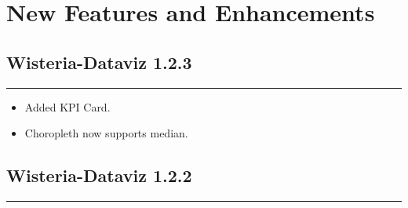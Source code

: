 \documentclass[
]{scrartcl}
\providecommand{\tightlist}{%
  \setlength{\itemsep}{0pt}\setlength{\parskip}{0pt}}
\begin{document}
\section{New Features and Enhancements}\label{sec-new-features}

\subsection*{Wisteria-Dataviz 1.2.3}\label{section}

\begin{center}\rule{0.5\linewidth}{0.5pt}\end{center}

\begin{itemize}
\tightlist
\item
  Added KPI Card.
\item
  Choropleth now supports median.
\end{itemize}

\subsection*{Wisteria-Dataviz 1.2.2}\label{section-1}

\begin{center}\rule{0.5\linewidth}{0.5pt}\end{center}
\end{document}
